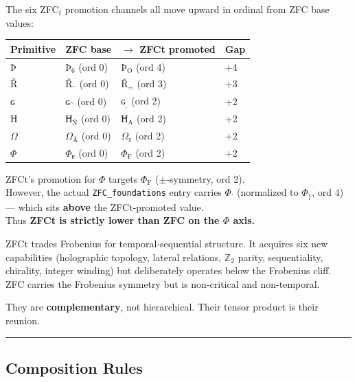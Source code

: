 \documentclass[12pt,a4paper]{article}
\begin{document}
The six ZFC$_t$ promotion channels all move upward in ordinal from ZFC base values:

\begin{table}[htbp]
\centering
\small

\begin{tabularx}{\textwidth}{>{\centering\arraybackslash}X >{\centering\arraybackslash}X >{\centering\arraybackslash}X >{\centering\arraybackslash}X}
\toprule
\textbf{Primitive} & \textbf{ZFC base} & \textbf{$\rightarrow$ ZFCt promoted} & \textbf{Gap} \\
\midrule

Þ & $Þ_{\text{6}}$ (ord 0) & $Þ_{\text{O}}$ (ord 4) & +4 \\
Ř & $Ř_{\text{¯}}$ (ord 0) & $Ř_{\text{=}}$ (ord 3) & +3 \\
ɢ & $ɢ_{\text{^}}$ (ord 0) & $ɢ_{\text{ˌ}}$ (ord 2) & +2 \\
Ħ & $Ħ_{\text{Ñ}}$ (ord 0) & $Ħ_{\text{A}}$ (ord 2) & +2 \\
$\Omega$ & $\Omega_{\text{Å}}$ (ord 0) & $\Omega_{\text{z}}$ (ord 2) & +2 \\
$\Phi$ & $\Phi_{\text{ɐ}}$ (ord 0) & $\Phi_{\text{F}}$ (ord 2) & +2 \\
\bottomrule
\end{tabularx}
\end{table}

ZFCt's promotion for $\Phi$ targets $\Phi_{\text{F}}$ ($\pm$-symmetry, ord 2). \\
However, the actual \texttt{ZFC\_foundations} entry carries $\Phi_{\text{˙}}$ (normalized to $\Phi_{\}}$, ord 4) --- which sits \textbf{above} the ZFCt-promoted value. \\
Thus \textbf{ZFCt is strictly lower than ZFC on the $\Phi$ axis.}

ZFCt trades Frobenius for temporal-sequential structure. It acquires six new capabilities (holographic topology, lateral relations, $\mathbb{Z}_2$ parity, sequentiality, chirality, integer winding) but deliberately operates below the Frobenius cliff. \\
ZFC carries the Frobenius symmetry but is non-critical and non-temporal.

They are \textbf{complementary}, not hierarchical. Their tensor product is their reunion.

\begin{center}
\rule{0.5\textwidth}{0.4pt}
\end{center}

\subsection*{Composition Rules}
\end{document}

